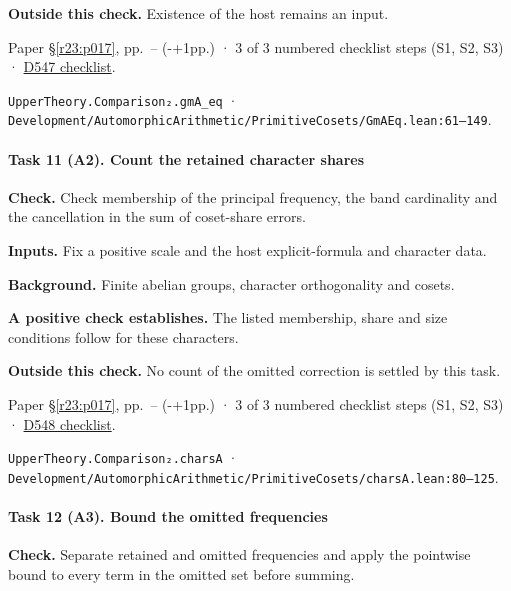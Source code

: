 \textbf{Outside this check.} Existence of the host remains an input.

Paper \S\ref{r23:p017}, pp.\ \pageref{v5:chars-start}--\pageref{v5:d547-end} (\number\numexpr{}-+1\relax pp.) · 3 of 3 numbered checklist steps (S1, S2, S3) · \href{https://github.com/GunheeC/rh-lean-verification-atlas/blob/v0.1.0/units/D547.check.md}{D547 checklist}.

\nolinkurl{UpperTheory.Comparison₂.gmA_eq} · \nolinkurl{Development/AutomorphicArithmetic/PrimitiveCosets/GmAEq.lean:61–149}.

\paragraph{Task 11 (A2). Count the retained character shares}\label{v7:task-11}

\textbf{Check.} Check membership of the principal frequency, the band cardinality and the cancellation in the sum of coset-share errors.

\textbf{Inputs.} Fix a positive scale and the host explicit-formula and character data.

\textbf{Background.} Finite abelian groups, character orthogonality and cosets.

\textbf{A positive check establishes.} The listed membership, share and size conditions follow for these characters.

\textbf{Outside this check.} No count of the omitted correction is settled by this task.

Paper \S\ref{r23:p017}, pp.\ \pageref{v5:d547-end}--\pageref{v5:d548-end} (\number\numexpr{}-+1\relax pp.) · 3 of 3 numbered checklist steps (S1, S2, S3) · \href{https://github.com/GunheeC/rh-lean-verification-atlas/blob/v0.1.0/units/D548.check.md}{D548 checklist}.

\nolinkurl{UpperTheory.Comparison₂.charsA} · \nolinkurl{Development/AutomorphicArithmetic/PrimitiveCosets/charsA.lean:80–125}.

\paragraph{Task 12 (A3). Bound the omitted frequencies}\label{v7:task-12}

\textbf{Check.} Separate retained and omitted frequencies and apply the pointwise bound to every term in the omitted set before summing.

